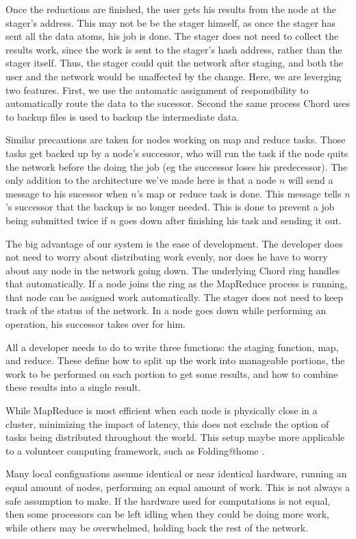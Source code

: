 \documentclass[conference, compsocconf, letterpaper]{IEEEtran}
\begin{document}
Once the reductions are finished, the user gets his results from the node at the stager's address.  This may not be be the stager himself, as once the stager has sent all the data atoms, his job is done.  The stager does not need to collect the results work, since the work is sent to the stager's hash address, rather than the stager itself.  Thus, the stager could quit the network after staging, and both the user and the network would be unaffected by the change. Here, we are leverging two features. First,  we use the automatic assignment of responsibility to automatically route the data to the sucessor. Second the same process Chord uses to backup files is used to backup the intermediate data. 

Similar precautions are taken for nodes working on map and reduce tasks.  Those tasks get backed up  by a node's successor, who will run the task if the node quits the network before the doing the job (eg the successor loses his predecessor).   The only addition to the architecture we've made here is that a node $n$ will send a message to his sucessor when  $n$'s map or reduce task is done.  This message tells $n$'s successor that the backup is no longer needed.  This is done to prevent a job being submitted twice if $n$ goes down after finishing his task and sending it out.

The big advantage of our system is the ease of development.  The developer does not need to worry about distributing work evenly, nor does he have to worry about any node in the network going down.  The underlying Chord ring handles that automatically.  If a node joins the ring as the MapReduce process is running, that node can be assigned work automatically.  The stager does not need to keep track of the status of the network.  In a node goes down while performing an operation, his successor takes over for him.

All a developer needs to do to write three functions: the staging function, map, and reduce.  These define how to split up the work into manageable portions,  the  work to be performed on each portion to get some results, and how to combine these results into a single result. 

While MapReduce is most efficient when each node is physically close in a cluster, minimizing the impact of latency, this does not exclude the option of tasks being distributed throughout the world.  This setup maybe more applicable to a volunteer computing framework, such as Folding@home \cite{folding}.

Many local configuations assume identical or near identical hardware, running an equal amount of nodes, performing an equal amount of work. This is not always a safe assumption to make.  If the hardware used for computations is not equal, then some processors can be left idling when they could be doing more work, while others may be overwhelmed, holding back the rest of the network.
\end{document}
